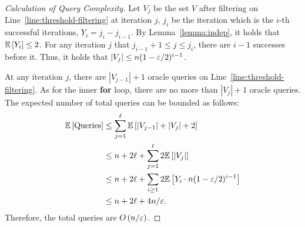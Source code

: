 



\begin{proof}[Calculation of Query Complexity]
    Let $V_j$ be the set $V$ after filtering on Line~\ref{line:threshold-filtering} at iteration $j$,
    $j_{i}$ be the iteration which is the $i$-th successful iterations,
    $Y_i=j_{i}-j_{i-1}$.
    By Lemma~\ref{lemma:indep}, it holds that $\mathbb{E} \left[ Y_i \right] \le 2$.
    For any iteration $j$ that $j_{i-1}+1 \le j \le j_i$,
    there are $i-1$ successes before it.
    Thus, it holds that $|V_j| \le n(1-\varepsilon/2)^{i-1}$.

    At any iteration $j$, there are $|V_{j-1}|+1$ oracle queries on Line~\ref{line:threshold-filtering}.
    As for the inner \textbf{for} loop, there are no more than $|V_j|+1$ oracle queries.
    The expected number of total queries can be bounded as follows:
    \begin{align*}
        \mathbb{E} \left[ \text{Queries} \right] &\le \sum_{j=1}^{\ell} \mathbb{E} \left[ |V_{j-1}|+|V_j|+2 \right]\\
        &\le n+2\ell+\sum_{j=1}^{\ell} 2\mathbb{E} \left[ |V_j| \right]\\
        &\le n+2\ell+\sum_{i\ge 1} 2\mathbb{E} \left[ Y_i\cdot n(1-\varepsilon/2)^{i-1} \right]\\
        &\le n+2\ell+4n/\varepsilon.
    \end{align*}
    Therefore, the total queries are $O\left( n/\varepsilon \right)$.
\end{proof}